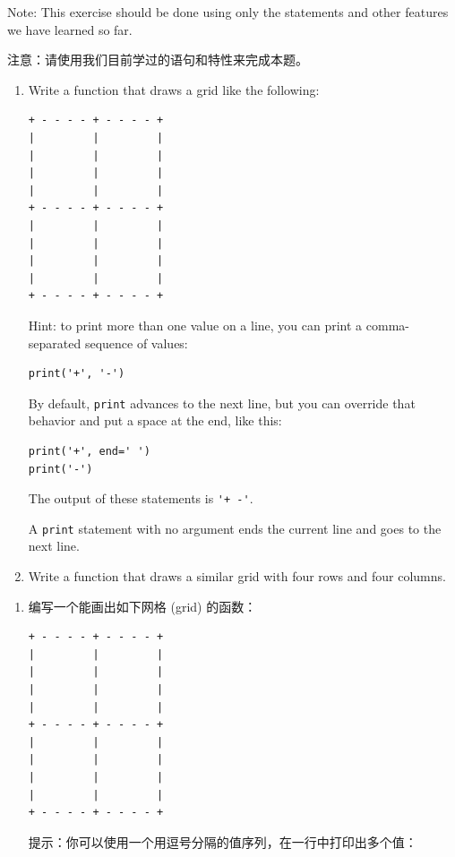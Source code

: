 \begin{exercise}

Note: This exercise should be
done using only the statements and other features we have learned so
far.

注意：请使用我们目前学过的语句和特性来完成本题。

\begin{enumerate}

\item Write a function that draws a grid like the following:

\begin{lstlisting}
+ - - - - + - - - - +
|         |         |
|         |         |
|         |         |
|         |         |
+ - - - - + - - - - +
|         |         |
|         |         |
|         |         |
|         |         |
+ - - - - + - - - - +
\end{lstlisting}
%
Hint: to print more than one value on a line, you can print
a comma-separated sequence of values:

\begin{lstlisting}
print('+', '-')
\end{lstlisting}
%
By default, {\tt print} advances to the next line, but you
can override that behavior and put a space at the end, like this:

\begin{lstlisting}
print('+', end=' ')
print('-')
\end{lstlisting}
%
The output of these statements is \verb"'+ -'".

A {\tt print} statement with no argument ends the current line and
goes to the next line.

\item Write a function that draws a similar grid
with four rows and four columns.

\end{enumerate}


\begin{enumerate}

\item 编写一个能画出如下网格 (grid) 的函数：

\begin{lstlisting}
+ - - - - + - - - - +
|         |         |
|         |         |
|         |         |
|         |         |
+ - - - - + - - - - +
|         |         |
|         |         |
|         |         |
|         |         |
+ - - - - + - - - - +
\end{lstlisting}
%
提示：你可以使用一个用逗号分隔的值序列，在一行中打印出多个值：


\end{enumerate}
\end{exercise}
